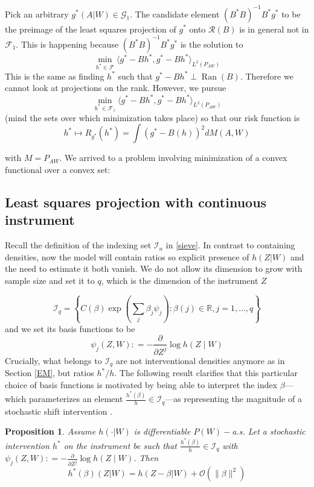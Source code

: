 \documentclass[12pt]{article}
\theoremstyle{thmstyleone}%
\newtheorem{propo}[theo]{Proposition}%
\theoremstyle{thmstyletwo}%
\theoremstyle{thmstylethree}%
\begin{document}
Pick an arbitrary $g^*(A|W)\in \mathcal{G}_1 $. The candidate element $(B^*B)^{-1}B^*g^*$ to be the preimage of the least squares projection of $g^*$ onto $\mathcal{R}(B)$ is in general not in $\mathcal{F}_1$. This is happening because  $(B^*B)^{-1}B^*g^*$ is the solution to 
		$$\min_{h^* \in \mathcal{F}} \langle g^* -Bh^*,g^* - Bh^* \rangle_{L^2(P_{AW})}$$
	This is the same as finding $h^*$ such that $g^* - Bh^* \perp \operatorname{Ran}(B)$. Therefore we cannot look at projections on the rank. However, we pursue
	$$\min_{h^* \in \mathcal{F}_1} \langle g^* -Bh^*,g^* - Bh^* \rangle_{L^2(P_{AW})}$$
(mind the sets over which minimization takes place) so that our risk function is \begin{equation}\label{sq:risk-app}
	h^* \mapsto R_{g^*}(h^*) = \int (g^* - B(h))^2 dM(A,W)\end{equation}
	
	with $M=P_{AW}$. We arrived to a problem involving minimization of a convex functional over a convex set:
	
		
	

	
	
	\subsection{Least squares projection with continuous instrument}\label{shift}
	
Recall the definition of the indexing set $\mathcal{I}_n$ in \ref{sieve}. In contrast to containing densities, now the model will contain ratios so explicit presence of $h(Z|W)$ and the need to estimate it both vanish. We do not allow its dimension to grow with sample size and set it to $q$, which is the dimension of the instrument $Z$
	
$$\mathcal{I}_q= \left\{C(\beta)\exp{\left(\sum_{j} \beta_j \psi_j\right) : \beta(j) \in \mathbb{R}, j = 1,\ldots,q }\right\}$$
and we set its basis functions to be $$	\psi_j(Z,W): = -\frac{\partial}{\partial Z^j} \log h(Z \mid W)$$
Crucially, what belongs to $\mathcal{I}_q$ are not interventional densities anymore as in Section \ref{EM}, but ratios $h^*/h$. The following result clarifies that this particular choice of basis functions is motivated by being able to interpret the index $\beta$—which parameterizes an element $\frac{h^*(\beta)}{h} \in \mathcal{I}_q$—as representing the magnitude of a stochastic shift intervention \citep{diaz}.

\begin{propo}\label{clashift}
	Assume $h(\cdot |W)$ is differentiable $P(W)-$a.s. Let a stochastic intervention $h^*$ on the instrument be such that $\frac{h^*(\beta)}{h} \in \mathcal{I}_q$ with $	
	\psi_j(Z,W): = -\frac{\partial}{\partial Z^j} \log h(Z \mid W)$. Then $$h^*(\beta)(Z|W) = h(Z -\beta |W) + \mathcal{O}(\|\beta\|^2)$$
	\end{propo}
	
\end{document}
